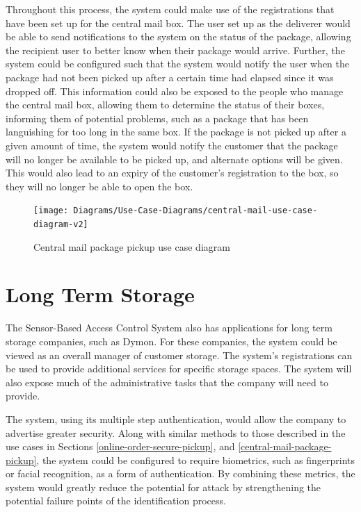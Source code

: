 \documentclass[12pt]{report}
\let\Oldsection\section
\renewcommand{\section}{\FloatBarrier\Oldsection}
\begin{document}
Throughout this process, the system could make use of the registrations that have been set up for the central mail
box. The user set up as the deliverer would be able to send notifications to the system on the status of the package, allowing
the recipient user to better know when their package would arrive. Further, the system could be configured such that the
system would notify the user when the package had not been picked up after a certain time had elapsed since it was
dropped off. This information could also be exposed to the people who manage the central mail box, allowing them to
determine the status of their boxes, informing them of potential problems, such as a package that has been languishing
for too long in the same box. If the package is not picked up after a given amount of time, the system would notify the
customer that the package will no longer be available to be picked up, and alternate options will be given. This would
also lead to an expiry of the customer's registration to the box, so they will no longer be able to open the box.

\begin{figure}
    \texttt{[image: Diagrams/Use-Case-Diagrams/central-mail-use-case-diagram-v2]}
    \caption{Central mail package pickup use case diagram}
    \label{fig:central-mail-use-case-diagram}
\end{figure}


\section{Long Term Storage} \label{long-term-storage}

The Sensor-Based Access Control System also has applications for long term storage companies, such as Dymon. For these 
companies, the system could be viewed as an overall manager of customer storage. The system's registrations can be used 
to provide additional services for specific storage spaces. The system will also expose much of the administrative 
tasks that the company will need to provide.

The system, using its multiple step authentication, would allow the company to advertise greater security. Along with
similar methods to those described in the use cases in Sections \ref{online-order-secure-pickup}, and
\ref{central-mail-package-pickup}, the system could be configured to require biometrics, such
as fingerprints or facial recognition, as a form of authentication. By combining these metrics, the system would greatly
reduce the potential for attack by strengthening the potential failure points of the identification process.
\end{document}
